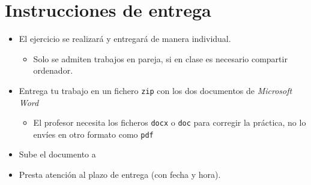 \section{Instrucciones de entrega}
\begin{itemize}
\item El ejercicio se realizará y entregará de manera individual.
  \begin{itemize}
  \item Solo se admiten trabajos en pareja, si en clase es necesario compartir ordenador.
  \end{itemize}
\item Entrega tu trabajo en un fichero \texttt{zip} con los dos documentos de \textit{Microsoft Word}
  \begin{itemize}
  \item El profesor necesita los ficheros \texttt{docx} o \texttt{doc} para corregir la práctica, no lo envíes en otro formato como \texttt{pdf}
  \end{itemize}

\item Sube el documento a 
\item Presta atención al plazo de entrega (con fecha y hora).
  
\end{itemize}





